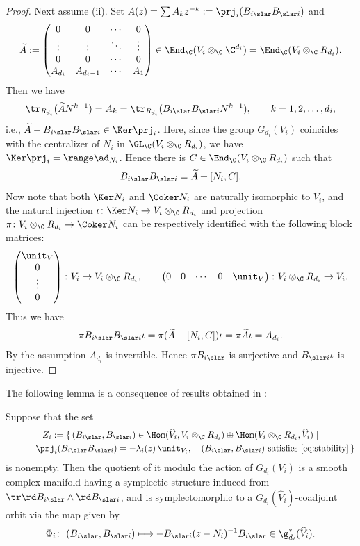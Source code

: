 \begin{proof}
Next assume (ii).
Set $A(z)=\sum A_k z^{-k}:=\prj_i(B_{i \slar}B_{\slar i})$ and
\[
\widetilde{A} :=
\begin{pmatrix}
0 & 0 & \cdots & 0 \\
\vdots & \vdots & \ddots & \vdots \\
0 & 0 & \cdots & 0 \\
A_{d_i} & A_{d_i-1} & \cdots & A_1
\end{pmatrix}
\in \End_\C(V_i \otimes_\C \C^{d_i})=\End_\C(V_i \otimes_\C R_{d_i}).
\]
Then we have
\[
\tr_{R_{d_i}}(\widetilde{A}N^{k-1}) = A_k
= \tr_{R_{d_i}}(B_{i \slar}  B_{\slar i}N^{k-1}),
\qquad k=1,2,\dots ,d_i,
\]
i.e., $\widetilde{A}-B_{i \slar}B_{\slar i} \in \Ker \prj_i$.
Here, since the group $G_{d_i}(V_i)$ coincides with the centralizer of $N_i$
in $\GL_\C(V_i \otimes_\C R_{d_i})$, we have $\Ker \prj_i = \range \ad_{N_i}$.
Hence there is $C \in \End_\C(V_i \otimes_\C R_{d_i})$ such that
\[
B_{i \slar}  B_{\slar i} = \widetilde{A} + [N_i,C].
\]
Now note that both $\Ker N_i$ and $\Coker N_i$ are naturally isomorphic to $V_i$,
and the natural injection $\iota \colon \Ker N_i \to V_i \otimes_\C R_{d_i}$ and
projection $\pi \colon V_i \otimes_\C R_{d_i} \to \Coker N_i$
can be respectively identif\/ied with
the following block matrices:
\[
\begin{pmatrix} \unit_V \\ 0 \\ \vdots \\ 0
\end{pmatrix} \colon V_i \to V_i \otimes_\C R_{d_i}, \qquad
\begin{pmatrix}
0 & 0 & \cdots & 0 & \unit_V
\end{pmatrix} \colon V_i \otimes_\C R_{d_i} \to V_i.
\]
Thus we have
\begin{gather}\label{eq:momentrel}
\pi B_{i \slar}  B_{\slar i} \iota =
\pi (\widetilde{A} + [N_i,C]) \iota =
\pi \widetilde{A} \iota = A_{d_i}.
\end{gather}
By the assumption $A_{d_i}$ is invertible.
Hence $\pi B_{i \slar}$ is surjective and $B_{\slar i} \iota$ is injective.
\end{proof}


The following lemma is a consequence of results obtained in
\cite{0911.3863}:
\begin{Lemma}\label{lem:orbit1}
Suppose that the set
\begin{gather*}
Z_i :=
\{\, (B_{i \slar},B_{\slar i}) \in \Hom(\widehat{V}_i,V_i\otimes_\C R_{d_i})
\oplus \Hom(V_i\otimes_\C R_{d_i},\widehat{V}_i) \mid \\
\phantom{Z_i := \{\, }{} \prj_i(B_{i \slar}B_{\slar i})=-\lambda_i(z)\,\unit_{V_i},\quad
\text{\rm $(B_{i \slar}, B_{\slar i})$
satisfies \eqref{eq:stability}}
\,\}
\end{gather*}
is nonempty.
Then the quotient of it modulo the action of $G_{d_i}(V_i)$
is a smooth complex manifold having a
symplectic structure induced from
$\tr \rd B_{i \slar} \wedge \rd B_{\slar i}$,
and is symplectomorphic to
a $G_{d_i}(\widehat{V}_i)$-coadjoint orbit via the map given by
\[
\Phi_i \colon \ (B_{i \slar},B_{\slar i}) \longmapsto
- B_{\slar i}(z-N_i)^{-1}B_{i \slar} \in \g^*_{d_i}(\widehat{V}_i).
\]
\end{Lemma}

